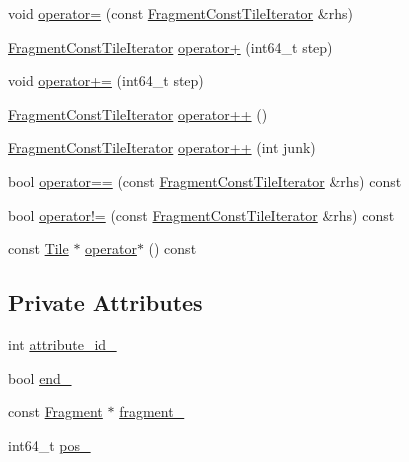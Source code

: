 \begin{DoxyCompactItemize}
void \hyperlink{classFragmentConstTileIterator_a811d91db367c3d9f446574031c4684d4}{operator=} (const \hyperlink{classFragmentConstTileIterator}{Fragment\+Const\+Tile\+Iterator} \&rhs)
\item 
\hyperlink{classFragmentConstTileIterator}{Fragment\+Const\+Tile\+Iterator} \hyperlink{classFragmentConstTileIterator_a8c39a88dde3d6791d0661960fe0f4e26}{operator+} (int64\+\_\+t step)
\item 
void \hyperlink{classFragmentConstTileIterator_a070a1b3aed52641fa4ffee8451fe8571}{operator+=} (int64\+\_\+t step)
\item 
\hyperlink{classFragmentConstTileIterator}{Fragment\+Const\+Tile\+Iterator} \hyperlink{classFragmentConstTileIterator_aa446f1e3a1700e456b5d0d8f191b8b9a}{operator++} ()
\item 
\hyperlink{classFragmentConstTileIterator}{Fragment\+Const\+Tile\+Iterator} \hyperlink{classFragmentConstTileIterator_a3c6c85c62719c361057fb8e9e0ab3cce}{operator++} (int junk)
\item 
bool \hyperlink{classFragmentConstTileIterator_a44e948d441ea70a032b5906c77a2c460}{operator==} (const \hyperlink{classFragmentConstTileIterator}{Fragment\+Const\+Tile\+Iterator} \&rhs) const 
\item 
bool \hyperlink{classFragmentConstTileIterator_af78368b756a63b4b5c0fa349b3cdcda7}{operator!=} (const \hyperlink{classFragmentConstTileIterator}{Fragment\+Const\+Tile\+Iterator} \&rhs) const 
\item 
const \hyperlink{classTile}{Tile} $\ast$ \hyperlink{classFragmentConstTileIterator_a5a28341fd13eaa52a23a72a501e9d829}{operator$\ast$} () const 
\end{DoxyCompactItemize}
\subsection*{Private Attributes}
\begin{DoxyCompactItemize}
\item 
int \hyperlink{classFragmentConstTileIterator_a1c4bf8ed4df64e7c5e49519781228d3b}{attribute\+\_\+id\+\_\+}
\item 
bool \hyperlink{classFragmentConstTileIterator_adadeb9e214fd8d5d21e7124c4b77bd27}{end\+\_\+}
\item 
const \hyperlink{classFragment}{Fragment} $\ast$ \hyperlink{classFragmentConstTileIterator_a037c2611dede11d9d3ad7110340e91d8}{fragment\+\_\+}
\item 
int64\+\_\+t \hyperlink{classFragmentConstTileIterator_a11d875ee32e9d9cbdaf784534134eaf2}{pos\+\_\+}
\end{DoxyCompactItemize}



